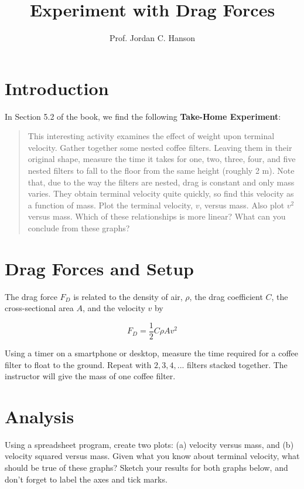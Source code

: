 \documentclass{article}
\begin{document}
\title{Experiment with Drag Forces}
\author{Prof. Jordan C. Hanson}

\maketitle

\section{Introduction}

In Section 5.2 of the book, we find the following \textbf{Take-Home Experiment}:

\begin{quote}
This interesting activity examines the effect of weight upon terminal velocity. Gather together some nested coffee filters. Leaving them in their original shape, measure the time it takes for one, two, three, four, and five nested filters to fall to the floor from the same height (roughly 2 m).  Note that, due to the way the filters are nested, drag is constant and only mass varies. They obtain terminal velocity quite quickly, so find this velocity as a function of mass.  Plot the terminal velocity, $v$, versus mass. Also plot $v^2$ versus mass.  Which of these relationships is more linear? What can you conclude from these graphs?
\end{quote}

\section{Drag Forces and Setup}

The drag force $F_D$ is related to the density of air, $\rho$, the drag coefficient $C$, the cross-sectional area $A$, and the velocity $v$ by

\begin{equation}
F_D = \frac{1}{2}C\rho A v^2
\end{equation}

Using a timer on a smartphone or desktop, measure the time required for a coffee filter to float to the ground.  Repeat with $2, 3, 4, ... $ filters stacked together.  The instructor will give the mass of one coffee filter.

\section{Analysis}

Using a spreadsheet program, create two plots: (a) velocity versus mass, and (b) velocity squared versus mass.  Given what you know about terminal velocity, what should be true of these graphs?  Sketch your results for both graphs below, and don't forget to label the axes and tick marks.
\end{document}

